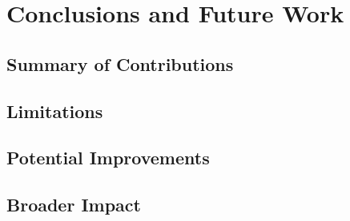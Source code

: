 \chapter[Chapter 5]{Conclusions and Future Work}
\label{chap:conclusions_future_work}


\section{Summary of Contributions}
\label{sec:summary_contributions}

\section{Limitations}
\label{sec:limitations_conclusions}

\section{Potential Improvements}
\label{sec:potential_improvements}

\section{Broader Impact}
\label{sec:broader_impact}